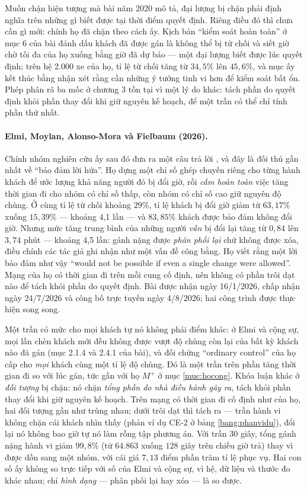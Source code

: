 Muốn chặn hiện tượng mà bài năm 2020 mô tả, đại lượng bị chặn phải định nghĩa trên những gì biết
được tại thời điểm quyết định. Riêng điều đó thì chưa cần gì mới: chính họ đã chặn theo cách ấy.
Kịch bản ``kiểm soát hoàn toàn'' ở mục 6 của bài đánh dấu khách đã được gán là không thể bị từ
chối và siết giờ chờ tối đa của họ xuống bằng giờ đã dự báo --- một đại lượng biết được lúc quyết
định; trên hệ 2.000 xe của họ, tỉ lệ từ chối tăng từ $34{,}5\%$ lên $45{,}6\%$, và mục ấy kết thúc
bằng nhận xét rằng cần những ý tưởng tinh vi hơn để kiểm soát bất ổn. Phép phân rã ba mốc ở
chương 3 tồn tại vì một lý do khác: tách phần do quyết định khỏi phần thay đổi khi giữ nguyên kế
hoạch, để một trần có thể chỉ tính phần thứ nhất.

\paragraph{Elmi, Moylan, Alonso-Mora và Fielbaum (2026).} Chính nhóm nghiên cứu ấy sau đó đưa ra
một câu trả lời \cite{elmi2026}, và đây là đối thủ gần nhất về ``bảo đảm lời hứa''. Họ dựng một
chỉ số ghép chuyến riêng cho từng hành khách để ước lượng khả năng người đó bị đổi giờ, rồi
\emph{cấm hoàn toàn} việc tăng thời gian đi cho nhóm có chỉ số thấp, còn nhóm có chỉ số cao giữ
nguyên độ chùng. Ở cùng tỉ lệ từ chối khoảng $29\%$, tỉ lệ khách bị đổi giờ giảm từ $63{,}17\%$
xuống $15{,}39\%$ --- khoảng 4,1 lần --- và $83{,}85\%$ khách được bảo đảm không đổi giờ. Nhưng mức
tăng trung bình của những người \emph{vẫn} bị đổi lại tăng từ $0{,}84$ lên $3{,}74$ phút ---
khoảng 4,5 lần: gánh nặng được \emph{phân phối lại} chứ không được xóa, điều chính các tác giả
ghi nhận như một vấn đề công bằng. Họ viết rằng một lời bảo đảm như vậy ``would not be possible if
even a single change were allowed''. Mạng của họ có thời gian đi trên mỗi cung cố định, nên không
có phần trôi dạt nào để tách khỏi phần do quyết định. Bài được nhận ngày 16/1/2026, chấp nhận ngày
24/7/2026 và công bố trực tuyến ngày 4/8/2026; hai công trình được thực hiện song song.

Một trần có mức cho mọi khách tự nó không phải điểm khác: ở Elmi và cộng sự, mọi lần chèn khách
mới đều không được vượt độ chùng còn lại của bất kỳ khách nào đã gán (mục 2.1.4 và 2.4.1 của bài),
và đối chứng ``ordinary control'' của họ cấp cho \emph{mọi} khách cùng một tỉ lệ độ chùng. Đó là
một trần trên phần tăng thời gian đi so với lúc gán, tức gần với họ $M^{+}$ ở mục \ref{muc:hocong}.
Khóa luận khác ở \emph{đối tượng} bị chặn: nó chặn \emph{tổng phần do nhà điều hành gây ra}, tách
khỏi phần thay đổi khi giữ nguyên kế hoạch. Trên mạng có thời gian đi cố định như của họ, hai đối
tượng gần như trùng nhau; dưới trôi dạt thì tách ra --- trần hành vi không chặn cái khách nhìn thấy
(phản ví dụ CE-2 ở bảng \ref{bang:phanvidu}), đổi lại nó không bao giờ tự nó làm rỗng tập phương
án. Với trần 30 giây, tổng gánh nặng hành vi giảm $99{,}8\%$
(từ $64.863$ xuống $128$ giây trên chiều giờ trả) thay vì được dồn sang một nhóm, với cái giá
$7{,}13$ điểm phần trăm tỉ lệ phục vụ. Hai con số ấy không so trực tiếp với số của Elmi và cộng
sự, vì hệ, dữ liệu và thước đo khác nhau; chỉ \emph{hình dạng} --- phân phối lại hay xóa --- là so
được.

